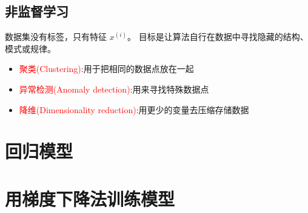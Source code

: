 \documentclass[12pt,a4paper]{ctexart}
\begin{document}
\subsection{非监督学习}
\begin{definitionbox}[非监督学习的关键特征]
数据集没有标签，只有特征 $x^{(i)}$。
目标是让算法自行在数据中寻找隐藏的结构、模式或规律。
\end{definitionbox}

\begin{examplebox}[监督学习的分类和主要特征]
\begin{itemize}
  \item \textcolor{red}{聚类(Clustering)}:用于把相同的数据点放在一起
  \item \textcolor{red}{异常检测(Anomaly detection)}:用来寻找特殊数据点
  \item \textcolor{red}{降维(Dimensionality reduction)}:用更少的变量去压缩存储数据

\end{itemize}
\end{examplebox}


\section{回归模型}

\begin{examplebox}[例题 1]

\end{examplebox}

\section{用梯度下降法训练模型}

\begin{mistakebox}

\end{mistakebox}
\end{document}
